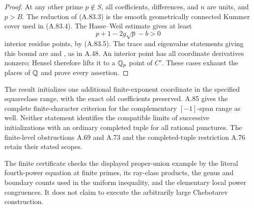 \begin{proof}
At any other prime $p\notin S$, all coefficients, differences,
and $n$ are units, and $p>B$.
The reduction of (A.83.3) is the smooth geometrically connected
Kummer cover used in (A.83.4).  The Hasse--Weil estimate gives
at least
\[
                        p+1-2g\sqrt p-b>0
 \tag{A.83.17}
\]
interior residue points, by (A.83.5).
The trace and eigenvalue statements giving this bound are
\cite[(1.5.1), Theorem (1.6)]{AgentDeligneWeilI} and
\cite[Proposition 14.2]{AgentMilneLEC}, as in A.48.
An interior point has all coordinate derivatives nonzero;
Hensel therefore lifts it to a $\mathbb Q_p$ point of $C'$.
These cases exhaust the places of $\mathbb Q$ and prove every assertion.
\end{proof}

The result initializes one additional finite-exponent coordinate
in the specified squareclass range, with the exact old coefficients
preserved.  A.85 gives the complete finite-character criterion
for the complementary $[-1]$-span range as well.
Neither statement identifies the compatible limits of
successive initializations with an ordinary completed tuple for
all rational punctures.  The finite-level obstructions A.69 and
A.73 and the completed-tuple restriction A.76 retain their stated
scopes.

The finite certificate 
checks the displayed proper-union example by the literal fourth-power
equation at finite primes, its ray-class products, the genus and
boundary counts used in the uniform inequality, and the elementary
local power congruences.  It does not claim to execute the
arbitrarily large Chebotarev construction.
